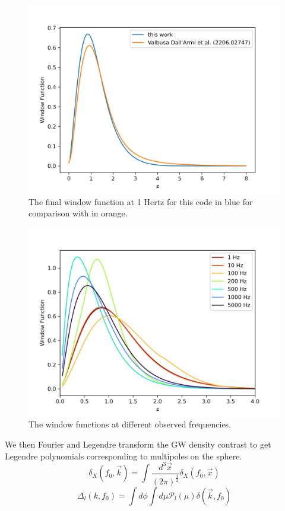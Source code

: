 \begin{figure}
    \centering
    \includegraphics[width=0.8\linewidth]{Images/window_comparison.png}
    \caption[The final window function at 1 Hertz for this code for comparison with \cite{dallarmi_dipole_2022}.]{The final window function at 1 Hertz for this code in blue for comparison with \cite{dallarmi_dipole_2022} in orange.}
    \label{window_comparison}
\end{figure} 
\begin{figure}
    \centering
    \includegraphics[width=1\linewidth]{Images/window_diff_frequencies.png}
    \caption{The window functions at different observed frequencies.}
    \label{window_frequencies}
\end{figure} 


We then Fourier and Legendre transform the GW density contrast to get Legendre polynomials corresponding to multipoles on the sphere.
\begin{equation}
    \delta_X(f_0, \vec{k}) = \int \frac{d^3\vec{x}}{(2\pi)^\frac{3}{2}} 
    \delta_X(f_0, \vec{x})
\end{equation}
\begin{equation}
    \Delta_l(k, f_0) = \int d\phi \int d\mu \mathcal{P}_l(\mu) 
    \delta(\vec{k}, f_0)
\end{equation}

